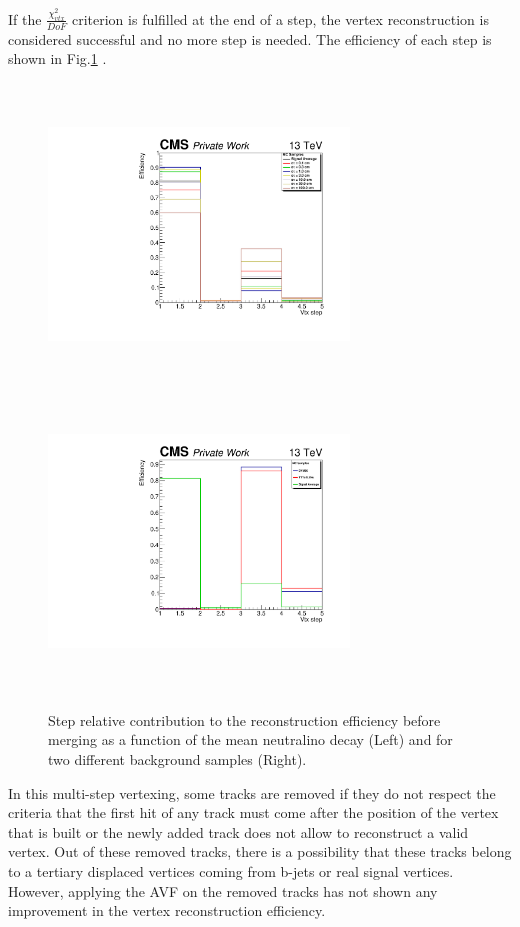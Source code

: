 \documentclass{cernatlasnote}
\begin{document}
    If the $\frac{\chi^2_{vtx}}{DoF}$ criterion is fulfilled at the end of a step, the vertex reconstruction is  considered successful and no more step is needed. The efficiency of each step is shown in Fig.\ref{fig:StepEffi} .

    \begin{figure}[ht]
\centering
\includegraphics[height=8cm, width=8cm, trim= 0cm 0cm 0cm 0cm,clip]{images/VTXEff/VtxStepEffi_Svsctau.pdf}\includegraphics[height=8cm, width=8cm, trim= 0cm 0cm 0cm 0cm,clip]{images/VTXEff/VtxStepEffi_SvsBKG.pdf}
\caption{\label{fig:StepEffi} Step relative contribution to the reconstruction efficiency before merging as a function of the mean neutralino decay (Left) and for two different background samples (Right). }
\end{figure}   

        In this multi-step vertexing, some tracks are removed if they do not respect the criteria that the first hit of any track must come after the position of the vertex that is built or the newly added track does not allow to reconstruct a valid vertex. Out of these removed tracks, there is a possibility that these tracks belong to a tertiary displaced vertices coming from b-jets or real signal vertices. However, applying the AVF on the removed tracks has not shown any improvement in the vertex reconstruction efficiency.
    
\end{document}
